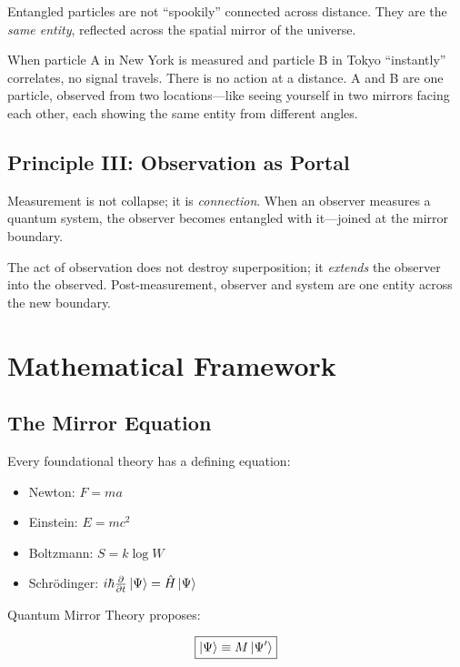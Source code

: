 \documentclass[12pt,a4paper]{article}
\begin{document}
Entangled particles are not ``spookily'' connected across distance. They are the \textit{same entity}, reflected across the spatial mirror of the universe.

When particle A in New York is measured and particle B in Tokyo ``instantly'' correlates, no signal travels. There is no action at a distance. A and B are one particle, observed from two locations---like seeing yourself in two mirrors facing each other, each showing the same entity from different angles.

\subsection{Principle III: Observation as Portal}

Measurement is not collapse; it is \textit{connection}. When an observer measures a quantum system, the observer becomes entangled with it---joined at the mirror boundary.

The act of observation does not destroy superposition; it \textit{extends} the observer into the observed. Post-measurement, observer and system are one entity across the new boundary.

\section{Mathematical Framework}

\subsection{The Mirror Equation}

Every foundational theory has a defining equation:
\begin{itemize}
    \item Newton: $F = ma$
    \item Einstein: $E = mc^2$
    \item Boltzmann: $S = k \log W$
    \item Schrödinger: $i\hbar\frac{\partial}{\partial t}\ket{\Psi} = \hat{H}\ket{\Psi}$
\end{itemize}

Quantum Mirror Theory proposes:

\begin{equation}
\boxed{\ket{\Psi} \equiv M\ket{\Psi'}}
\label{eq:mirror}
\end{equation}
\end{document}

